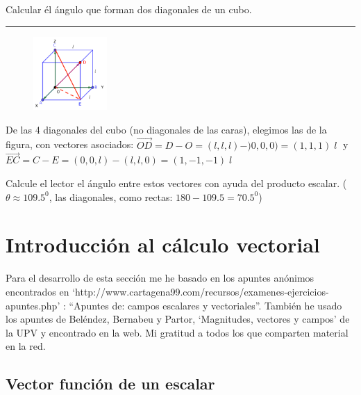 \vspace{3mm}
\begin{miejercicio}

	Calcular él ángulo que forman dos diagonales de un cubo.

\rule{200pt}{0.1pt}

\begin{multicols}{2}	
	\begin{figure}[H]
	\centering
	\includegraphics[width=0.25\textwidth]{imagenes/imagenescv/T10IM16.png}
	\end{figure}
De las 4 diagonales del cubo (no diagonales de las caras), elegimos las de la figura, con vectores asociados: $\overrightarrow{OD}=D-O=(l,l,l)-)0,0,0)=(1,1,1)\; l\; $ y $\overrightarrow{EC}=C-E=(0,0,l)-(l,l,0)=(1,-1,-1)\; l$

Calcule el lector el ángulo entre estos vectores con ayuda del producto escalar. \scriptsize{( $\theta \approx 109.5^0$, las diagonales, como rectas: $180-109.5=	70.5^0$)}

\end{multicols}
\end{miejercicio}



\section{Introducción al cálculo vectorial}

Para el desarrollo de esta sección me he basado en los apuntes anónimos encontrados en `http://www.cartagena99.com/recursos/examenes-ejercicios-apuntes.php' : ``Apuntes de: campos escalares y vectoriales''. También he usado los apuntes de Beléndez, Bernabeu y Partor, `Magnitudes, vectores y campos' de la UPV y encontrado en la web. Mi gratitud a todos los que comparten material en la red.

\subsection{Vector función de un escalar}

